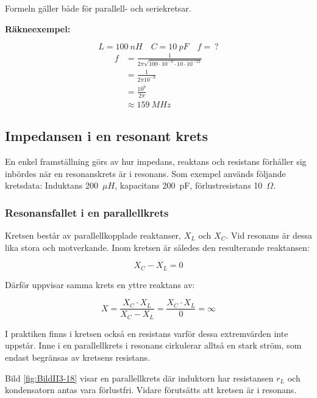 Formeln gäller både för parallell- och seriekretsar.

\textbf{Räkneexempel:}

\[L = 100\ nH \quad C = 10\ pF \quad f =\ ?\]
\begin{align*}
  f &= \frac{1}{2\pi \sqrt{100 \cdot 10^{-9} \cdot 10 \cdot 10^{-12}}} \\
  &= \frac{1}{2\pi 10^{-9}} \\
  &= \frac{10^9}{2\pi } \\
  &\approx 159\ MHz
\end{align*}

\subsection{Impedansen i en resonant krets}


En enkel framställning görs av hur impedans, reaktans och resistans förhåller
sig inbördes när en resonanskrets är i resonans.
Som exempel används följande kretsdata: Induktans 200~\(\mu H\),
kapacitans 200~pF, förlustresistans 10~\(\Omega\).

\subsubsection{Resonansfallet i en parallellkrets}
\label{parallellresonans}


Kretsen består av parallellkopplade reaktanser, \(X_L\) och \(X_C\).
Vid resonans är dessa lika stora och motverkande.
Inom kretsen är således den resulterande reaktansen:

\[X_C - X_L = 0\]

Därför uppvisar samma krets en yttre reaktans av:

\[
  X = \frac{X_C \cdot X_L}{X_C - X_L}
  = \frac{X_C \cdot X_L}{0}
  = \infty
\]

I praktiken finns i kretsen också en resistans varför dessa extremvärden inte
uppstår.
Inne i en parallellkrets i resonans cirkulerar alltså en stark ström,
som endast begränsas av kretsens resistans.

Bild \ref{fig:BildII3-18} visar en parallellkrets där induktorn har resistansen
\(r_L\) och kondensatorn antas vara förlustfri.
Vidare förutsätts att kretsen är i resonans.

